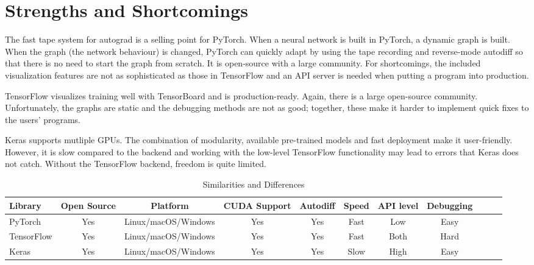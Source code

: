 \documentclass[conference]{IEEEtran}
\begin{document}
\section{Strengths and Shortcomings}

The fast tape system for autograd is a selling point for PyTorch. When a neural network is built in PyTorch, a dynamic graph is built. When the graph (the network behaviour) is changed, PyTorch can quickly adapt by using the tape recording and reverse-mode autodiff so that there is no need to start the graph from scratch. It is open-source with a large community. For shortcomings, the included visualization features are not as sophisticated as those in TensorFlow and an API server is needed when putting a program into production. 

TensorFlow visualizes training well with TensorBoard and is production-ready. Again, there is a large open-source community. Unfortunately, the graphs are static and the debugging methods are not as good; together, these make it harder to implement quick fixes to the users' programs. 

Keras supports mutliple GPUs. The combination of modularity, available pre-trained models and fast deployment make it user-friendly. However, it is slow compared to the backend and working with the low-level TensorFlow functionality may lead to errors that Keras does not catch. Without the TensorFlow backend, freedom is quite limited.  

\begin{table*}
\caption{Similarities and Differences}
\label{my-label}
\begin{tabularx}{\textwidth}{@{} l *{10}{C}}
\toprule
Library  
& Open Source & Platform & CUDA Support & Autodiff & Speed & API level & Debugging \\ 
\midrule
PyTorch & Yes & Linux/macOS/Windows & Yes & Yes & Fast & Low & Easy\\ 
\addlinespace
TensorFlow & Yes & Linux/macOS/Windows & Yes & Yes & Fast & Both & Hard\\ 
\addlinespace
Keras & Yes & Linux/macOS/Windows & Yes & Yes & Slow & High & Easy\\ 
\bottomrule
\end{tabularx}
\end{table*}


\end{document}
